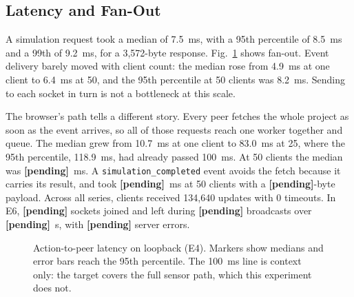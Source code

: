 \documentclass[conference]{IEEEtran}
\newcommand{\rttPfifty}{7.5}
\newcommand{\rttPninetyfive}{8.5}
\newcommand{\rttPninetynine}{9.2}
\newcommand{\simBytes}{3{,}572}
\newcommand{\fanEventPfiftyA}{4.9}
\newcommand{\fanEventPfiftyF}{6.4}
\newcommand{\fanEventPninetyfiveF}{8.2}
\newcommand{\fanGetPfiftyA}{10.7}
\newcommand{\fanGetPfiftyE}{83.0}
\newcommand{\fanGetPninetyfiveE}{118.9}
\newcommand{\fanDelivered}{134{,}640}
\newcommand{\fanTimeouts}{0}
\newcommand{\churnErrors}{\textbf{[pending]}}
\newcommand{\churnJoins}{\textbf{[pending]}}
\newcommand{\churnSeconds}{\textbf{[pending]}}
\newcommand{\churnUpdates}{\textbf{[pending]}}
\newcommand{\fanGetPfiftyF}{\textbf{[pending]}}
\newcommand{\fanSimBytes}{\textbf{[pending]}}
\newcommand{\fanSimPfiftyF}{\textbf{[pending]}}
\begin{document}
\subsection{Latency and Fan-Out}
A simulation request took a median of \rttPfifty~ms, with a 95th percentile of \rttPninetyfive~ms and a 99th of \rttPninetynine~ms, for a \simBytes-byte response. Fig.~\ref{fig:latency} shows fan-out. Event delivery barely moved with client count: the median rose from \fanEventPfiftyA~ms at one client to \fanEventPfiftyF~ms at 50, and the 95th percentile at 50 clients was \fanEventPninetyfiveF~ms. Sending to each socket in turn is not a bottleneck at this scale.

The browser's path tells a different story. Every peer fetches the whole project as soon as the event arrives, so all of those requests reach one worker together and queue. The median grew from \fanGetPfiftyA~ms at one client to \fanGetPfiftyE~ms at 25, where the 95th percentile, \fanGetPninetyfiveE~ms, had already passed 100~ms. At 50 clients the median was \fanGetPfiftyF~ms. A \texttt{simulation\_completed} event avoids the fetch because it carries its result, and took \fanSimPfiftyF~ms at 50 clients with a \fanSimBytes-byte payload. Across all series, clients received \fanDelivered{} updates with \fanTimeouts{} timeouts. In E6, \churnJoins{} sockets joined and left during \churnUpdates{} broadcasts over \churnSeconds~s, with \churnErrors{} server errors.

\begin{figure}[t]
\centering
{}
\caption{Action-to-peer latency on loopback (E4). Markers show medians and error bars reach the 95th percentile. The 100~ms line is context only: the target covers the full sensor path, which this experiment does not.}
\label{fig:latency}
\end{figure}
\end{document}
